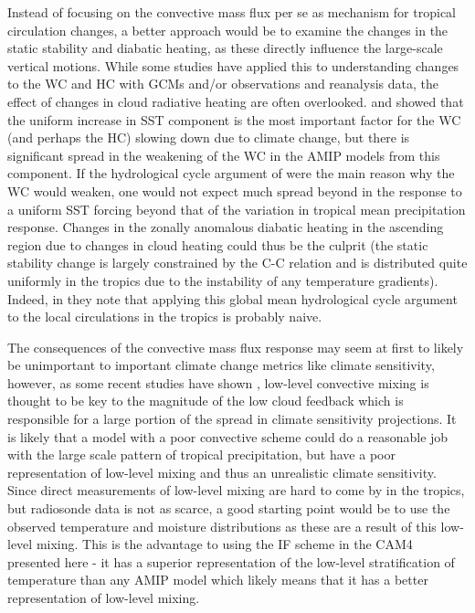 \documentclass[letterpaper,12pt,titlepage,oneside,final]{book}
\begin{document}
Instead of focusing on the convective mass flux per se as mechanism for tropical circulation changes, a better approach would be to examine the changes in the static stability and diabatic heating, as these directly influence the large-scale vertical motions. While some studies have applied this to understanding changes to the WC \citep{sohn_role_2016,ma_mechanisms_2011,li_strengthening_2015} and HC \citep{mitas_recent_2006,ma_mechanisms_2011} with GCMs and/or observations and reanalysis data, the effect of changes in cloud radiative heating are often overlooked. \citep{he_anthropogenic_2015} and \citep{ma_mechanisms_2011} showed that the uniform increase in SST component is the most important factor for the WC (and perhaps the HC) slowing down due to climate change, but there is significant spread in the weakening of the WC in the AMIP models from this component. If the hydrological cycle argument of \citep{held_robust_2006} were the main reason why the WC would weaken, one would not expect much spread beyond in the response to a uniform SST forcing beyond that of the variation in tropical mean precipitation response. Changes in the zonally anomalous diabatic heating in the ascending region due to changes in cloud heating could thus be the culprit (the static stability change is largely constrained by the C-C relation and is distributed quite uniformly in the tropics due to the instability of any temperature gradients). Indeed, in \citep{schneider_water_2010} they note that applying this global mean hydrological cycle argument to the local circulations in the tropics is probably naive.

The consequences of the convective mass flux response may seem at first to likely be unimportant to important climate change metrics like climate sensitivity, however, as some recent studies have shown \citep{sherwood_spread_2014,brient_shallowness_2016}, low-level convective mixing is thought to be key to the magnitude of the low cloud feedback which is responsible for a large portion of the spread in climate sensitivity projections. It is likely that a model with a poor convective scheme could do a reasonable job with the large scale pattern of tropical precipitation, but have a poor representation of low-level mixing and thus an unrealistic climate sensitivity. Since direct measurements of low-level mixing are hard to come by in the tropics, but radiosonde data is not as scarce, a good starting point would be to use the observed temperature and moisture distributions as these are a result of this low-level mixing. This is the advantage to using the IF scheme in the CAM4 presented here - it has a superior representation of the low-level stratification of temperature than any AMIP model which likely means that it has a better representation of low-level mixing.
\end{document}

